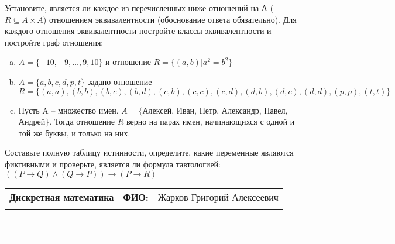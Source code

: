 \documentclass[10pt]{exam}
\newcommand{\class}{Дискретная математика}
\newcommand{\examdate}{}
\begin{document}
\begin{questions}
\question
Установите, является ли каждое из перечисленных ниже отношений на А ($R \subseteq A \times A$) отношением эквивалентности (обоснование ответа обязательно). Для каждого отношения эквивалентности постройте классы 
эквивалентности и постройте граф отношения:
\begin{enumerate} [a)]\setcounter{enumi}{0}
\item $A = \{-10, -9, … , 9, 10\}$ и отношение $R = \{(a,b)|a^{2} = b^{2}\}$
\item $A = \{a, b, c, d, p, t\}$ задано отношение $R = \{(a, a), (b, b), (b, c), (b, d), (c, b), (c, c), (c, d), (d, b), (d, c), (d, d), (p,p), (t,t)\}$
\item Пусть A – множество имен. $A = \{ $Алексей, Иван, Петр, Александр, Павел, Андрей$ \}$. Тогда отношение $R$ верно на парах имен, начинающихся с одной и той же буквы, и только на них.
\end{enumerate}\question Составьте полную таблицу истинности, определите, какие переменные являются фиктивными и проверьте, является ли формула тавтологией:
$(( P \rightarrow Q) \land (Q \rightarrow P)) \rightarrow (P \rightarrow R)$

\end{questions}
\newpage
\begin{flushright}
\begin{tabular}{p{2.8in} r l}
\textbf{\class} & \textbf{ФИО:} &Жарков Григорий Алексеевич
\\

\textbf{\examdate} &&\\
\end{tabular}\\
\end{flushright}
\rule[1ex]{\textwidth}{.1pt}
\end{document}
